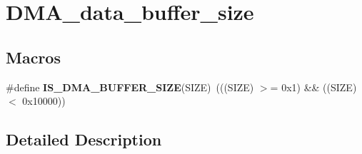 \hypertarget{group___d_m_a__data__buffer__size}{}\section{D\+M\+A\+\_\+data\+\_\+buffer\+\_\+size}
\label{group___d_m_a__data__buffer__size}
\subsection*{Macros}
\begin{DoxyCompactItemize}
\item 
\hypertarget{group___d_m_a__data__buffer__size_ga72ef4033bb3bc2cdfdbe579083b05e32}{}\#define {\bfseries I\+S\+\_\+\+D\+M\+A\+\_\+\+B\+U\+F\+F\+E\+R\+\_\+\+S\+I\+Z\+E}(S\+I\+Z\+E)~(((S\+I\+Z\+E) $>$= 0x1) \&\& ((\+S\+I\+Z\+E) $<$ 0x10000))\label{group___d_m_a__data__buffer__size_ga72ef4033bb3bc2cdfdbe579083b05e32}

\end{DoxyCompactItemize}


\subsection{Detailed Description}
